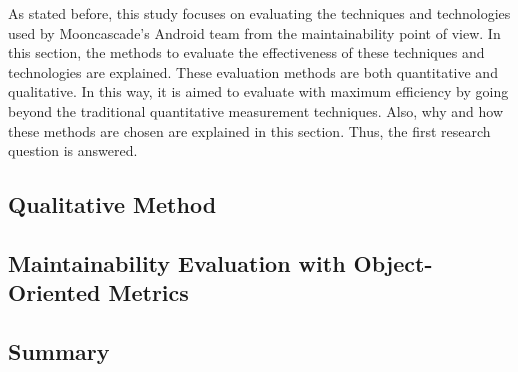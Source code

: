 As stated before, this study focuses on evaluating the techniques and technologies used by Mooncascade's Android team from the maintainability point of view. In this section, the methods to evaluate the effectiveness of these techniques and technologies are explained. These evaluation methods are both quantitative and qualitative. In this way, it is aimed to evaluate with maximum efficiency by going beyond the traditional quantitative measurement techniques. Also, why and how these methods are chosen are explained in this section. Thus, the first research question is answered.

\subsection{Qualitative Method}


\subsection{Maintainability Evaluation with Object-Oriented Metrics}
\label{section:3.2}


\subsection{Summary}

